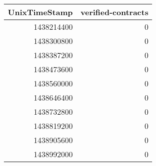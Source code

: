 \begin{tabular}{rr}
\toprule
 UnixTimeStamp &  verified-contracts \\
\midrule
    1438214400 &                   0 \\
    1438300800 &                   0 \\
    1438387200 &                   0 \\
    1438473600 &                   0 \\
    1438560000 &                   0 \\
    1438646400 &                   0 \\
    1438732800 &                   0 \\
    1438819200 &                   0 \\
    1438905600 &                   0 \\
    1438992000 &                   0 \\
\bottomrule
\end{tabular}
